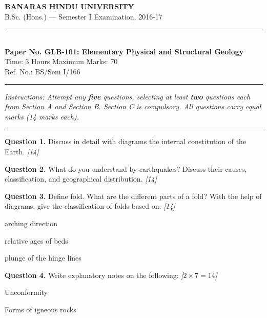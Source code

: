 \documentclass[11pt,a4paper]{article}
\newcommand{\pts}[1]{\hfill   \textit{[#1]}}
\begin{document}
\begin{center}
  {\large\bfseries BANARAS HINDU UNIVERSITY}\\[2pt]
  {\normalsize B.Sc. (Hons.) --- Semester I Examination, 2016-17}\\[6pt]
  \rule{0.8\linewidth}{0.5pt}\\[6pt]
  {\large\bfseries Paper No. GLB-101: Elementary Physical and Structural Geology}\\[4pt]
  {\normalsize Time: 3 Hours \hfill Maximum Marks: 70}\\[2pt]
  {\small Ref. No.: BS/Sem I/166}
\end{center}
\rule{\linewidth}{0.4pt}
\smallskip



\noindent   \textit{Instructions: Attempt any   \textbf{five} questions, selecting at least   \textbf{two} questions each from Section A and Section B. Section C is compulsory. All questions carry equal marks (14 marks each).}
\bigskip

\bigskip


\rule{\linewidth}{0.4pt}\smallskip




\noindent   \textbf{Question 1.} Discuss in detail with diagrams the internal constitution of the Earth. \pts{14}

\medskip


\noindent   \textbf{Question 2.} What do you understand by earthquakes? Discuss their causes, classification, and geographical distribution. \pts{14}

\medskip


\noindent   \textbf{Question 3.} Define fold. What are the different parts of a fold? With the help of diagrams, give the classification of folds based on: \pts{14}

\begin{parts}
  \item arching direction
  \item relative ages of beds
  \item plunge of the hinge lines
\end{parts}

\medskip


\noindent   \textbf{Question 4.} Write explanatory notes on the following: \pts{$2  \times 7 = 14$}

\begin{parts}
  \item Unconformity
  \item Forms of igneous rocks
\end{parts}
\end{document}
